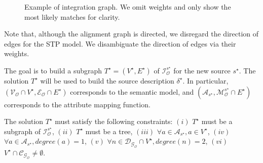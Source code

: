\documentclass[letterpaper]{article} %
\newcommand{\authornote}[3]{
  {\fbox{\sc 
  #1}:$\blacktriangleright$\textcolor{#2}{\small{#3}}$\blacktriangleleft$}%
}
\newcommand{\npr}[1]{\authornote{NPR}{orange}{#1}}
\newcommand{\forijcai}[1]{}
\begin{document}
\begin{figure}[ht]
{ }
\caption{Example of integration graph. We omit weights and only show the most likely 
matches for clarity.\forijcai{ Data node
are the same as in Fig. \ref{FIG:ali}.}}
\label{FIG:inte}
\vspace{-3mm}
\end{figure}

Note that, although the alignment graph is directed, we disregard the
direction of edges for the STP model.
We disambiguate the direction \forijcai{and semantics} of edges via their
weights.
\forijcai{We can further improve this step by using patterns.}

The goal is to build a subgraph $T^\star= (V^\star, E^\star)$ of
$\mathcal{I}_\mathcal{O}^{s^\star}$ for the new source $s^\star$. The solution 
$T^\star$ will 
be used to build the source description $\delta^\star$. 
In particular, $(\mathcal{V_O} \cap V^\star,\mathcal{E_O} \cap E^\star)$ 
corresponds to the semantic model, and 
$(\mathcal{A}_{s^\star},\mathcal{M}_\mathcal{O}^{s^\star} \cap E^\star)$ 
corresponds to 
the attribute mapping function.

The solution $T^\star$ must satisfy the following constraints:
	$(i)$ %
	$T^\star$ must be a subgraph of $\mathcal{I}_\mathcal{O}^{s^\star}$,
	$(ii)$ %
	$T^\star$ must be a tree,
	$(iii)$ %
	$\forall a \in \mathcal{A}_{s^\star}, a\in V^\star$,
	$(iv)$ %
	$\forall a \in \mathcal{A}_{s^\star}, degree(a) = 1$,
	$(v)$ %
	$\forall n \in \mathcal{D_{G_O}} \cap V^\star, degree(n) = 2$,
	$(vi)$ 
	$V^\star \cap \mathcal{C_{G_O}} \neq \emptyset$.
\end{document}
